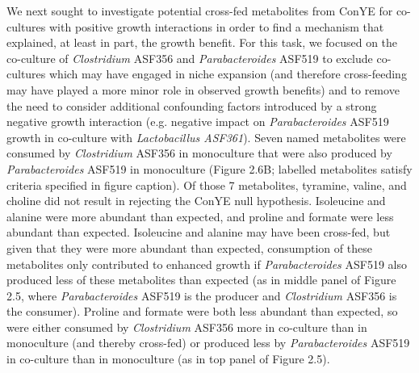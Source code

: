 \documentclass[11pt,twocolumn,notitlepage,openany,twoside]{book}
\begin{document}
\begin{refsection}
We next sought to investigate potential cross-fed metabolites from ConYE for co-cultures with positive growth interactions in order to find a mechanism that explained, at least in part, the growth benefit. For this task, we focused on the co-culture of \textit{Clostridium} ASF356 and \textit{Parabacteroides} ASF519 to exclude co-cultures which may have engaged in niche expansion (and therefore cross-feeding may have played a more minor role in observed growth benefits) and to remove the need to consider additional confounding factors introduced by a strong negative growth interaction (e.g. negative impact on \textit{Parabacteroides} ASF519 growth in co-culture with \textit{Lactobacillus ASF361}). Seven named metabolites were consumed by \textit{Clostridium} ASF356 in monoculture that were also produced by \textit{Parabacteroides} ASF519 in monoculture (Figure 2.6B; labelled metabolites satisfy criteria specified in figure caption). Of those 7 metabolites, tyramine, valine, and choline did not result in rejecting the ConYE null hypothesis. Isoleucine and alanine were more abundant than expected, and proline and formate were less abundant than expected. Isoleucine and alanine may have been cross-fed, but given that they were more abundant than expected, consumption of these metabolites only contributed to enhanced growth if \textit{Parabacteroides} ASF519 also produced less of these metabolites than expected (as in middle panel of Figure 2.5, where \textit{Parabacteroides} ASF519 is the producer and \textit{Clostridium} ASF356 is the consumer). Proline and formate were both less abundant than expected, so were either consumed by \textit{Clostridium} ASF356 more in co-culture than in monoculture (and thereby cross-fed) or produced less by \textit{Parabacteroides} ASF519 in co-culture than in monoculture (as in top panel of Figure 2.5).


\end{refsection}
\end{document}

